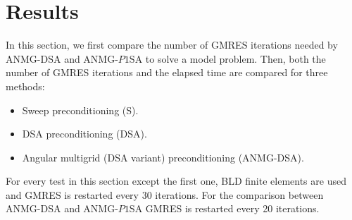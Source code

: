 \section{Results}
In this section, we first compare the number of GMRES iterations needed by
ANMG-DSA and ANMG-$P1$SA to solve a model problem. Then, both the number of
GMRES iterations and the elapsed time are compared for three methods:
\begin{itemize}
  \item Sweep preconditioning (S).
  \item DSA preconditioning (DSA).
  \item Angular multigrid (DSA variant) preconditioning (ANMG-DSA).
\end{itemize}
For every test in this section except the first one, BLD finite elements are used
and GMRES is restarted every 30 iterations. For the comparison between
ANMG-DSA and ANMG-$P1$SA GMRES is restarted every 20 iterations.
